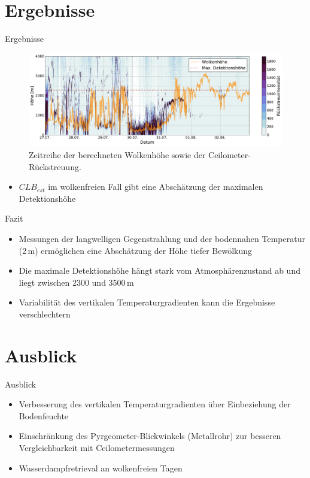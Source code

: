 \documentclass{beamer}
\begin{document}
\section{Ergebnisse}
\begin{frame}{Ergebnisse}
\begin{figure}[ht]
    \centering
    \includegraphics[width=1\textwidth]{figures/clb.pdf}
    \caption{Zeitreihe der berechneten Wolkenhöhe sowie der Ceilometer-Rückstreuung.}
    \label{fig:clb}
\end{figure}
\begin{itemize}
  \item $CLB_{est}$ im wolkenfreien Fall gibt eine Abschätzung der maximalen
      Detektionshöhe
\end{itemize}
\end{frame}

\begin{frame}{Fazit}
\begin{itemize}
  \vfill\item Messungen der langwelligen Gegenstrahlung und der bodennahen
      Temperatur (2\,m) ermöglichen eine Abschätzung der Höhe tiefer Bewölkung
  \vfill\item Die maximale Detektionshöhe hängt stark vom Atmosphärenzustand ab
      und liegt zwischen 2300 und 3500\,m
  \vfill\item Variabilität des vertikalen Temperaturgradienten kann die
      Ergebnisse verschlechtern 
\vfill
\end{itemize}
\end{frame}

\section{Ausblick}
\begin{frame}{Ausblick}
\begin{itemize}
  \vfill\item Verbesserung des vertikalen Temperaturgradienten über
      Einbeziehung der Bodenfeuchte
  \vfill\item Einschränkung des Pyrgeometer-Blickwinkels (Metallrohr) zur
      besseren Vergleichbarkeit mit Ceilometermessungen
  \vfill\item Wasserdampfretrieval an wolkenfreien Tagen
  \vfill
\end{itemize}
\end{frame}
\end{document}
